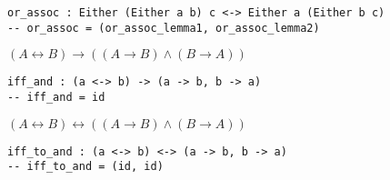\documentclass{acm_proc_article-sp}
\renewcommand{\iff}{\leftrightarrow}
\renewcommand{\implies}{\rightarrow}
\begin{document}
\begin{verbatim}
or_assoc : Either (Either a b) c <-> Either a (Either b c)
-- or_assoc = (or_assoc_lemma1, or_assoc_lemma2)
\end{verbatim}

\((A \iff B) \implies ((A \implies B) \land (B \implies A))\)

\begin{verbatim}
iff_and : (a <-> b) -> (a -> b, b -> a)
-- iff_and = id
\end{verbatim}

\((A \iff B) \iff ((A \implies B) \land (B \implies A))\)

\begin{verbatim}
iff_to_and : (a <-> b) <-> (a -> b, b -> a)
-- iff_to_and = (id, id)
\end{verbatim}

\balancecolumns
\end{document}
